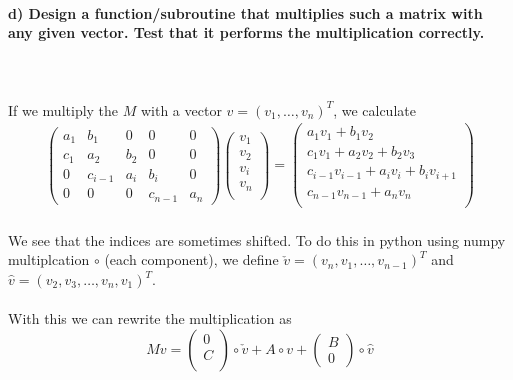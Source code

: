 \paragraph{
    d) Design a function/subroutine that multiplies such a matrix with
    any given vector. Test that it performs the multiplication correctly.
} \ \\
    \\
    If we multiply the $M$ with a vector $v = (v_1, \dots, v_n)^T$,
    we calculate \\
    \begin{align}
        \begin{pmatrix}
            a_1 & b_1 & 0      & 0       & 0 \\
            c_1 & a_2 & b_2    & 0       & 0 \\
            0   & c_{i-1} & a_i & b_i    &0    \\
            0   & 0   & 0      & c_{n-1} & a_n
        \end{pmatrix}
        \begin{pmatrix}
            v_1 \\ v_2 \\v_i \\ v_n\\
        \end{pmatrix}=\begin{pmatrix}
            a_1 v_1 + b_1 v_2 \\
            c_1 v_1 + a_2 v_2 + b_2 v_3 \\
            c_{i-1} v_{i-1} + a_i v_i + b_i v_{i+1} \\
            c_{n-1} v_{n-1} + a_n v_n\\
        \end{pmatrix}
    \end{align} \ \\
    We see that the indices are sometimes shifted. To do this in
    python using numpy multiplcation $\circ$ (each component), we
    define $\check{v} = (v_n, v_1, \dots, v_{n-1})^T$ and
    $\hat{v} = (v_2, v_3, \dots, v_n , v_1)^T$. \\
    \\
    With this we can rewrite the multiplication as
    \begin{equation}
    	Mv =
    	\begin{pmatrix} 0 \\ C \\	\end{pmatrix}
    	\circ \check{v} + A \circ v +
    	\begin{pmatrix} B \\ 0	\end{pmatrix} \circ \hat{v}
    \end{equation} \ \\
